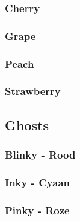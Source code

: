 \documentclass{report}
\begin{document}

      \subsubsection{Cherry} %
      \label{ssub:cherry}


      \subsubsection{Grape} %
      \label{ssub:grape}


      \subsubsection{Peach} %
      \label{ssub:peach}


      \subsubsection{Strawberry} %
      \label{ssub:strawberry}


    \subsection{Ghosts} %
    \label{sub:ghosts}

      \subsubsection{Blinky - Rood} %
      \label{ssub:blinky}


      \subsubsection{Inky - Cyaan} %
      \label{ssub:inky}


      \subsubsection{Pinky - Roze} %
      \label{ssub:pinky}
\end{document}
